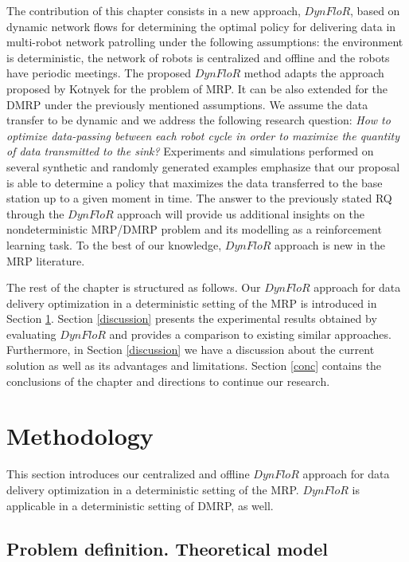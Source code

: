 The contribution of this chapter consists in a new approach, $DynFloR$, based on dynamic network flows for determining the optimal policy for delivering data in multi-robot network patrolling under the following assumptions: the environment is deterministic, the network of robots is centralized and offline and the robots have periodic meetings. The proposed $DynFloR$ method adapts the approach proposed by  Kotnyek \cite{flow} for the problem of MRP. It can be also extended for the DMRP under the previously mentioned assumptions. We assume the data transfer to be dynamic and we address the following research question: \emph{How to optimize data-passing between each robot cycle in order to maximize the quantity of data transmitted to the sink?} Experiments and simulations performed on several synthetic and randomly generated examples emphasize that our proposal is able to determine a policy that maximizes the data transferred to the base station up to a given moment in time.  The answer to the previously stated RQ through the $DynFloR$ approach will provide us additional insights on the nondeterministic MRP/DMRP problem and its modelling as a reinforcement learning task. To the best of our knowledge, $DynFloR$ approach is new in the MRP literature.

The rest of the chapter is structured as follows.  Our $DynFloR$ approach for data delivery optimization in a deterministic setting of the MRP is introduced in Section \ref{our}. Section \ref{discussion} presents the experimental results obtained by evaluating $DynFloR$ and provides a comparison to existing similar approaches. Furthermore, in Section \ref{discussion} we have a discussion about the current solution as well as its advantages and limitations. Section \ref{conc} contains the conclusions of the chapter and directions to continue our research.

\section{Methodology}\label{our}

This section introduces our centralized and offline $DynFloR$ approach for data delivery optimization in a deterministic setting of the MRP. $DynFloR$ is  applicable in a deterministic setting of DMRP, as well. 

\subsection{Problem definition. Theoretical model}\label{tm}

